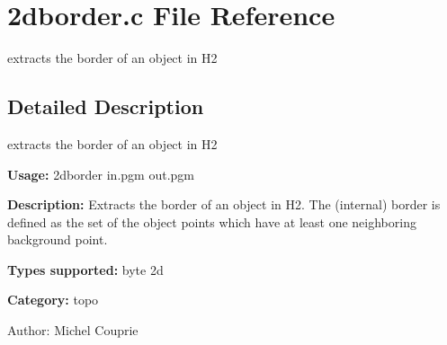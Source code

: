 \section{2dborder.c File Reference}
\label{2dborder_8c}
extracts the border of an object in H2  




\label{_details}
\subsection{Detailed Description}
extracts the border of an object in H2 

{\bf Usage:} 2dborder in.pgm out.pgm

{\bf Description:} Extracts the border of an object in H2. The (internal) border is defined as the set of the object points which have at least one neighboring background point.

{\bf Types supported:} byte 2d

{\bf Category:} topo

\begin{Desc}
\item[Author:]Michel Couprie \end{Desc}
